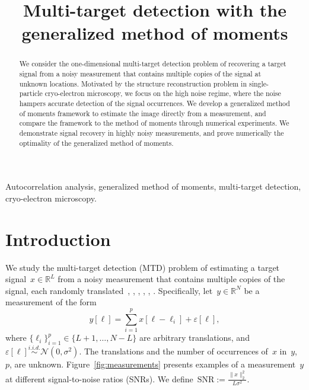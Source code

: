 \documentclass{article}
\title{Multi-target detection with the generalized method of moments}
\begin{document}
%
\maketitle
%
\begin{abstract}
We consider the one-dimensional multi-target detection problem of recovering a target signal from a noisy measurement that contains multiple copies of the signal at unknown locations. Motivated by the structure reconstruction problem in single-particle cryo-electron microscopy, we focus on the high noise regime, where the noise hampers accurate detection of the signal occurrences. We develop a generalized method of moments framework to estimate the image directly from a measurement, and compare the framework to the method of moments through numerical experiments. We demonstrate signal recovery in highly noisy measurements, and prove numerically the optimality of the generalized method of moments.
\end{abstract}
%
\begin{keywords}
Autocorrelation analysis, generalized method of moments, multi-target detection, cryo-electron microscopy.
\end{keywords}
%
\section{Introduction}
\label{sec:intro}
We study the multi-target detection (MTD) problem of estimating a target signal~$x \in \mathbb{R}^L$ from a noisy measurement that contains multiple copies of the signal, each randomly translated~\cite{bendory2018toward}, \cite{bendory2019multi}, \cite{lan2020multi}, \cite{marshall2020image}, \cite{bendory2021multi}, \cite{kreymer2021two}. Specifically, let~$y \in \mathbb{R}^N$ be a measurement of the form
\begin{equation}
\label{eq:model}
y[\ell] = \sum_{i=1}^{p} x[\ell - \ell_i] + \varepsilon[\ell],
\end{equation}
where \mbox{$\{\ell_i\}_{i=1}^{p} \in \{L + 1, \ldots, N-L\}$} are arbitrary translations, and~$\varepsilon[\ell]\overset{i.i.d.}{\sim} \mathcal{N}(0,\sigma^2)$. The translations and the number of occurrences of~$x$ in~$y$,~$p$, are unknown. Figure~\ref{fig:measurements} presents examples of a measurement~$y$ at different signal-to-noise ratios (SNRs). We define~\mbox{$\text{SNR} := \frac{\|x\|_2^2}{L \sigma^2}$}.
\end{document}
